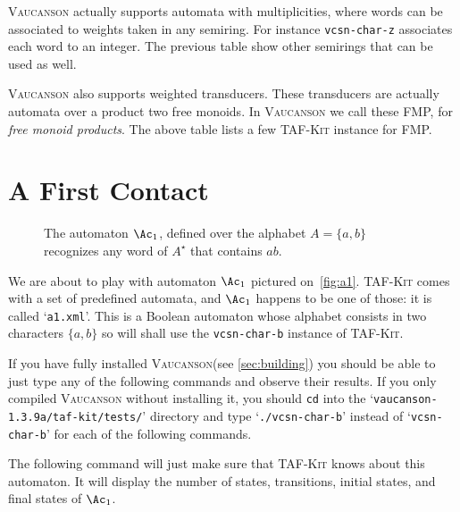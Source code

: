 \documentclass[a4paper]{report}
\def\VcsnVersion{1.3.9a}
\newcommand\file[1]{`\texttt{#1}'}
\newcommand\command[1]{\texttt{#1}}
\newcommand\samp[1]{`\texttt{#1}'}
\newcommand{\tafkit}{\textsc{TAF-Kit}\xspace}
\newcommand{\Vauc}{\textsc{Vaucanson}\xspace}
\begin{document}
\Vauc actually supports automata with multiplicities, where words can
be associated to weights taken in any semiring.  For instance
\command{vcsn-char-z} associates each word to an integer.  The previous
table show other semirings that can be used as well.

\Vauc also supports weighted transducers.  These transducers are
actually automata over a product two free monoids.  In \Vauc we call
these FMP, for \emph{free monoid products}.  The above table lists a
few \tafkit instance for FMP.

\section{A First Contact}\label{sec:firstcontact}

\begin{figure}[tbp] \centering
  \caption{The automaton $\Ac_1$, defined over the alphabet
    $A=\{a,b\}$ recognizes any word of $A^\star$ that
    contains $ab$. \label{fig:a1}}
\end{figure}

We are about to play with automaton $\Ac_1$ pictured
on~\autoref{fig:a1}.  \tafkit comes with a set of predefined automata,
and $\Ac_1$ happens to be one of those: it is called \file{a1.xml}.
This is a Boolean automaton whose alphabet consists in two characters
$\{a,b\}$ so will shall use the \command{vcsn-char-b} instance of
\tafkit.

If you have fully installed \Vauc (see \autoref{sec:building}) you
should be able to just type any of the following commands and observe
their results.  If you only compiled \Vauc without installing it, you
should \command{cd} into the
\file{vaucanson-\VcsnVersion/taf-kit/tests/} directory and type
\samp{./vcsn-char-b} instead of \samp{vcsn-char-b} for each of the
following commands.

The following command will just make sure that \tafkit knows about
this automaton.  It will display the number of states, transitions,
initial states, and final states of $\Ac_1$.
\end{document}
